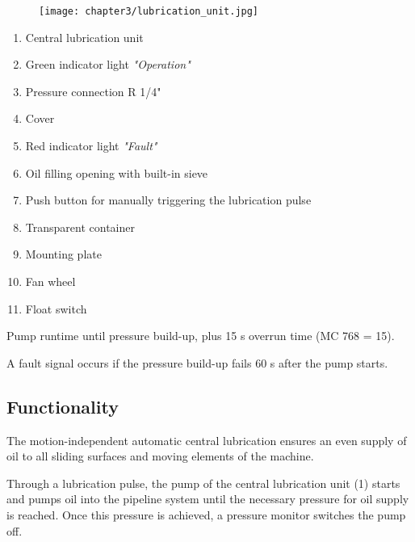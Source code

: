 
\begin{figure}[h]
    \centering
    \texttt{[image: chapter3/lubrication\_unit.jpg]}
\end{figure}

\begin{enumerate}
    \item Central lubrication unit
    \item Green indicator light \textit{"Operation"}
    \item Pressure connection R 1/4"
    \item Cover
    \item Red indicator light \textit{"Fault"}
    \item Oil filling opening with built-in sieve
    \item Push button for manually triggering the lubrication pulse
    \item Transparent container
    \item Mounting plate
    \item Fan wheel
    \item Float switch
\end{enumerate}


\noindent Pump runtime until pressure build-up, plus 15 s overrun time (MC 768 = 15).

\vspace{.3cm}

\noindent A fault signal occurs if the pressure build-up fails 60 s after the pump starts.


\subsection*{Functionality}

The motion-independent automatic central lubrication ensures an even supply of oil to all sliding surfaces and moving elements of the machine.

\vspace{.3cm}

\noindent Through a lubrication pulse, the pump of the central lubrication unit (1) starts and pumps oil into the pipeline system until the necessary pressure for oil supply is reached. Once this pressure is achieved, a pressure monitor switches the pump off.

